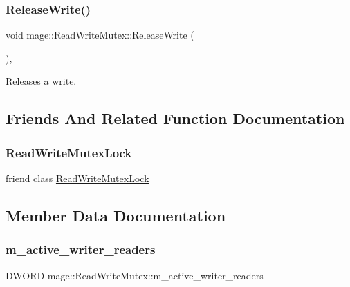 \subsubsection{\texorpdfstring{Release\+Write()}{ReleaseWrite()}}
{\footnotesize\ttfamily void mage\+::\+Read\+Write\+Mutex\+::\+Release\+Write (\begin{DoxyParamCaption}{ }\end{DoxyParamCaption})\hspace{0.3cm}{\ttfamily [private]}, {\ttfamily [noexcept]}}

Releases a write. 

\subsection{Friends And Related Function Documentation}
\hypertarget{classmage_1_1_read_write_mutex_a9efae7e36aecae5af2a7f3cd6c4e0dbb}{}\label{classmage_1_1_read_write_mutex_a9efae7e36aecae5af2a7f3cd6c4e0dbb} 
\subsubsection{\texorpdfstring{Read\+Write\+Mutex\+Lock}{ReadWriteMutexLock}}
{\footnotesize\ttfamily friend class \hyperlink{classmage_1_1_read_write_mutex_lock}{Read\+Write\+Mutex\+Lock}\hspace{0.3cm}{\ttfamily [friend]}}



\subsection{Member Data Documentation}
\hypertarget{classmage_1_1_read_write_mutex_a1e0ad98e517236170faae5b27decfdce}{}\label{classmage_1_1_read_write_mutex_a1e0ad98e517236170faae5b27decfdce} 
\subsubsection{\texorpdfstring{m\+\_\+active\+\_\+writer\+\_\+readers}{m\_active\_writer\_readers}}
{\footnotesize\ttfamily D\+W\+O\+RD mage\+::\+Read\+Write\+Mutex\+::m\+\_\+active\+\_\+writer\+\_\+readers\hspace{0.3cm}{\ttfamily [private]}}

